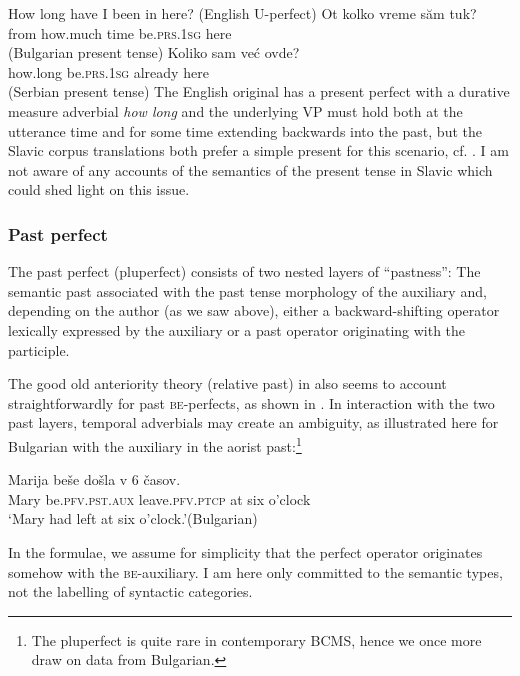 \documentclass[output=paper,colorlinks,citecolor=brown]{langscibook}
\begin{document}
\ea\ea \label{been} How long  have I  been  in here? \hfill (English U-perfect)
\ex\gll
Ot kolko vreme săm tuk? \\
from how.much time be.\textsc{prs.1sg} here \\ \hfill (Bulgarian present tense)
\ex\gll
Koliko sam već ovde? \\
how.long be.\textsc{prs.1sg} already here \\
\hfill (Serbian present tense)
\z\z
%
The English original has a present perfect with a durative measure adverbial {\textit{how long}} and the underlying VP must hold both at the utterance time and for some time extending backwards into the past, but the Slavic corpus translations both prefer a simple present for this scenario, cf. \citet{gronn_stechow2020}. I am not aware of any accounts of the semantics of the present tense in Slavic which could shed light on this issue. 

\subsubsection{Past perfect}
The past perfect (pluperfect)  consists of two nested layers of ``pastness'': The semantic
 past associated with the past tense morphology of the auxiliary and, depending on the author (as we saw above), either a backward-shifting operator lexically expressed by the auxiliary or a past operator originating with the participle. 

The good old anteriority theory (relative past) in  also seems to account straightforwardly  for past \textsc{be}-perfects, as shown in \citet{gronn_stechow2020}.
In interaction with the two past layers, temporal adverbials may  create an ambiguity, as illustrated here for Bulgarian with the auxiliary in the aorist past:\footnote{The pluperfect is quite rare in contemporary BCMS, hence we once more draw on data from Bulgarian.}

\ea\label{ex34}\gll
Marija beše došla v 6 časov.\\
Mary be.\textsc{pfv}.\textsc{pst}.\textsc{aux} leave.\textsc{pfv}.\textsc{ptcp} at six o'clock\\ 
\glt `Mary had left at six o'clock.'\hfill (Bulgarian)
\z

\noindent In the formulae, we assume for simplicity that the perfect operator originates somehow with the \textsc{be}-auxiliary. I am here only committed to the semantic types, not the labelling of syntactic categories.
\end{document}
